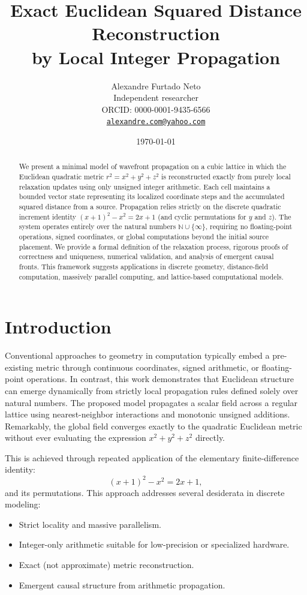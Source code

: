 \documentclass[11pt,a4paper]{article}
\title{
Exact Euclidean Squared Distance Reconstruction \\
by Local Integer Propagation
}
\author{
  Alexandre Furtado Neto \\
  \small Independent researcher \\
  \small ORCID: 0000-0001-9435-6566 \\
  \small \href{mailto:alexandre.com@yahoo.com}{\texttt{alexandre.com@yahoo.com}}
}
\date{\today}
\begin{document}
\maketitle

\begin{abstract}
We present a minimal model of wavefront propagation on a cubic lattice in which the Euclidean quadratic metric $r^2 = x^2 + y^2 + z^2$ is reconstructed exactly from purely local relaxation updates using only unsigned integer arithmetic. Each cell maintains a bounded vector state representing its localized coordinate steps and the accumulated squared distance from a source. Propagation relies strictly on the discrete quadratic increment identity $(x+1)^2 - x^2 = 2x + 1$ (and cyclic permutations for $y$ and $z$). The system operates entirely over the natural numbers $\mathbb{N} \cup \{\infty\}$, requiring no floating-point operations, signed coordinates, or global computations beyond the initial source placement. We provide a formal definition of the relaxation process, rigorous proofs of correctness and uniqueness, numerical validation, and analysis of emergent causal fronts. This framework suggests applications in discrete geometry, distance-field computation, massively parallel computing, and lattice-based computational models.
\end{abstract}

\section{Introduction}
\label{sec:intro}

Conventional approaches to geometry in computation typically embed a pre-existing metric through continuous coordinates, signed arithmetic, or floating-point operations. In contrast, this work demonstrates that Euclidean structure can emerge dynamically from strictly local propagation rules defined solely over natural numbers. The proposed model propagates a scalar field across a regular lattice using nearest-neighbor interactions and monotonic unsigned additions. Remarkably, the global field converges exactly to the quadratic Euclidean metric without ever evaluating the expression $x^2 + y^2 + z^2$ directly. 

This is achieved through repeated application of the elementary finite-difference identity:
\begin{equation}
(x+1)^2 - x^2 = 2x + 1,
\label{eq:basic_ident}
\end{equation}
and its permutations. This approach addresses several desiderata in discrete modeling:
\begin{itemize}
    \item Strict locality and massive parallelism.
    \item Integer-only arithmetic suitable for low-precision or specialized hardware.
    \item Exact (not approximate) metric reconstruction.
    \item Emergent causal structure from arithmetic propagation.
\end{itemize}
\end{document}
